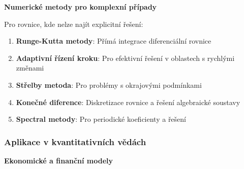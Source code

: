 \vspace{1\baselineskip}

\noindent\textbf{Numerické metody pro komplexní případy}

Pro rovnice, kde nelze najít explicitní řešení:

\begin{enumerate}
\item \textbf{Runge-Kutta metody}: Přímá integrace diferenciální rovnice

\item \textbf{Adaptivní řízení kroku}: Pro efektivní řešení v oblastech s rychlými změnami

\item \textbf{Střelby metoda}: Pro problémy s okrajovými podmínkami

\item \textbf{Konečné diference}: Diskretizace rovnice a řešení algebraické soustavy

\item \textbf{Spectral metody}: Pro periodické koeficienty a řešení
\end{enumerate}

\subsubsection{Aplikace v kvantitativních vědách}
\label{subsubsec:aplikace-abel}

\noindent\textbf{Ekonomické a finanční modely}

